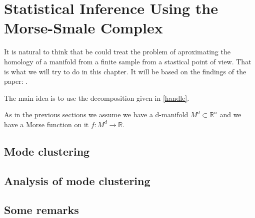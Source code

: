 \chapter{Statistical Inference Using the
Morse-Smale Complex}

It is natural to think that be could treat the problem
of aproximating the homology of a manifold from a finite 
sample from a stastical point of view. 
That is what we will try to do in this chapter. It will be based on the findings of the paper: \cite{che2017}.

The main idea is to use the decomposition given in \ref{handle}.

As in the previous sections we assume we have a d-manifold $M^d\subset \mathbb{R}^n$
and we have a Morse function on it $f:M^d\rightarrow \mathbb{R}$.


\section{Mode clustering}


\section{Analysis of mode clustering}


\section{Some remarks}
